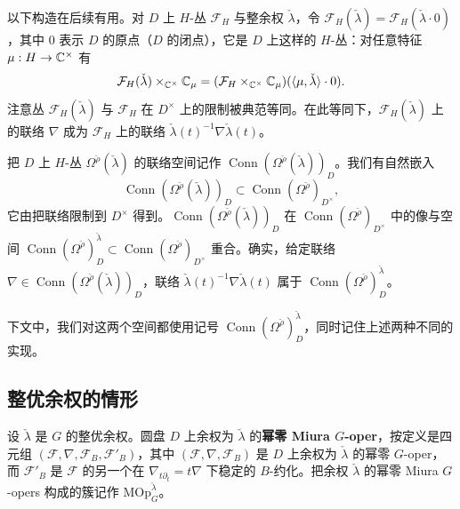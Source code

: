 
以下构造在后续有用。对 $D$ 上 $H$-丛 $\mathcal{F}_H$ 与整余权 $\check\lambda$，令 $\mathcal{F}_H(\check\lambda) = \mathcal{F}_H(\check\lambda\cdot 0)$，其中 $0$ 表示 $D$ 的原点（$D$ 的闭点），它是 $D$ 上这样的 $H$-丛：对任意特征 $\mu:H\to\mathbb{C}^\times$ 有
\[
\mathcal{F}_H(\check\lambda)\times_{\mathbb{C}^\times}\mathbb{C}_\mu = (\mathcal{F}_H\times_{\mathbb{C}^\times}\mathbb{C}_\mu)(\langle\mu,\check\lambda\rangle\cdot 0).
\]
注意丛 $\mathcal{F}_H(\check\lambda)$ 与 $\mathcal{F}_H$ 在 $D^\times$ 上的限制被典范等同。在此等同下，$\mathcal{F}_H(\check\lambda)$ 上的联络 $\nabla$ 成为 $\mathcal{F}_H$ 上的联络 $\check\lambda(t)^{-1}\nabla\check\lambda(t)$。

把 $D$ 上 $H$-丛 $\Omega^{\check\rho}(\check\lambda)$ 的联络空间记作 $\operatorname{Conn}(\Omega^{\check\rho}(\check\lambda))_D$。我们有自然嵌入
\[
\operatorname{Conn}(\Omega^{\check\rho}(\check\lambda))_D\subset\operatorname{Conn}(\Omega^{\check\rho})_{D^\times},
\]
它由把联络限制到 $D^\times$ 得到。$\operatorname{Conn}(\Omega^{\check\rho}(\check\lambda))_D$ 在 $\operatorname{Conn}(\Omega^{\check\rho})_{D^\times}$ 中的像与空间 $\operatorname{Conn}(\Omega^{\check\rho})^{\check\lambda}_D\subset\operatorname{Conn}(\Omega^{\check\rho})_{D^\times}$ 重合。确实，给定联络 $\nabla\in\operatorname{Conn}(\Omega^{\check\rho}(\check\lambda))_D$，联络 $\check\lambda(t)^{-1}\nabla\check\lambda(t)$ 属于 $\operatorname{Conn}(\Omega^{\check\rho})^{\check\lambda}_D$。

下文中，我们对这两个空间都使用记号 $\operatorname{Conn}(\Omega^{\check\rho})^{\check\lambda}_D$，同时记住上述两种不同的实现。

\subsection{整优余权的情形}

设 $\check\lambda$ 是 $G$ 的整优余权。圆盘 $D$ 上余权为 $\check\lambda$ 的\textbf{幂零 Miura $G$-oper}，按定义是四元组 $(\mathcal{F},\nabla,\mathcal{F}_B,\mathcal{F}'_B)$，其中 $(\mathcal{F},\nabla,\mathcal{F}_B)$ 是 $D$ 上余权为 $\check\lambda$ 的幂零 $G$-oper，而 $\mathcal{F}'_B$ 是 $\mathcal{F}$ 的另一个在 $\nabla_{t\partial_t} = t\nabla$ 下稳定的 $B$-约化。把余权 $\check\lambda$ 的幂零 Miura $G$-opers 构成的簇记作 $\mathrm{MOp}^{\check\lambda}_G$。


